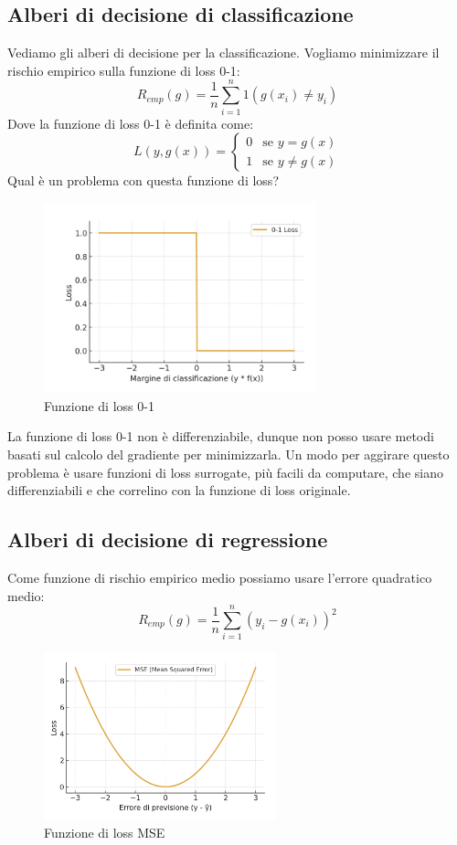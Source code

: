 \subsection{Alberi di decisione di classificazione}
Vediamo gli alberi di decisione per la classificazione.
Vogliamo minimizzare il rischio empirico sulla funzione di loss 0-1:
\[
R_{emp}(g) = \frac{1}{n} \sum_{i=1}^n 1(g(x_i) \neq y_i)
\]
Dove la funzione di loss 0-1 è definita come:
\[
L(y, g(x)) = \begin{cases}
0 & \text{se } y = g(x) \\
1 & \text{se } y \neq g(x)
\end{cases}
\]
Qual è un problema con questa funzione di loss?
\begin{figure}[h]
	\centering
	\includegraphics[width=0.7\textwidth]{pictures/loss10.png}
	\caption{Funzione di loss 0-1}
\end{figure}
La funzione di loss 0-1 non è differenziabile, dunque non posso usare metodi basati sul calcolo del gradiente per minimizzarla.
Un modo per aggirare questo problema è usare funzioni di loss surrogate, più facili da computare, che siano differenziabili e che correlino con la funzione di loss originale.
\subsection{Alberi di decisione di regressione}
Come funzione di rischio empirico medio possiamo usare l'errore quadratico medio:
\[
R_{emp}(g) = \frac{1}{n} \sum_{i=1}^n (y_i - g(x_i))^2
\]
\begin{figure}[h]
	\centering
	\includegraphics[width=0.6\textwidth]{pictures/MSE.png}
	\caption{Funzione di loss MSE}
\end{figure}

